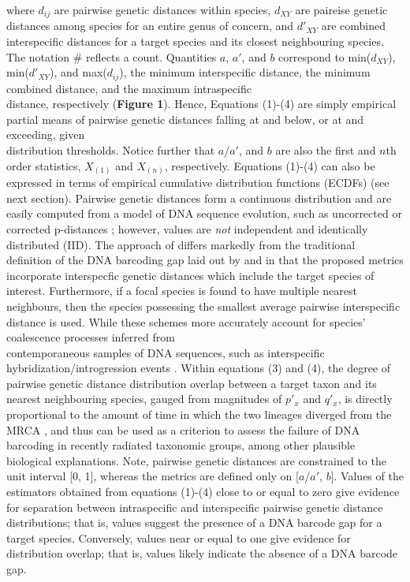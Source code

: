\documentclass[12pt]{article}
\begin{document}
\noindent where $d_{ij}$ are pairwise genetic distances within species, $d_{XY}$ are paireise genetic distances among species for an entire genus of concern, and $d'_{XY}$ are combined interspecific distances for a target species and its closest neighbouring species. The notation \# reflects a count.  Quantities $a$, $a'$, and $b$ correspond to min($d_{XY}$), min($d'_{XY}$), and max($d_{ij}$), the minimum interspecific distance, the minimum combined distance, and the maximum intraspecific \\ distance, respectively (\textbf{Figure 1}). Hence, Equations (1)-(4) are simply empirical partial means of pairwise genetic distances falling at and below, or at and exceeding, given \\ distribution thresholds. Notice further that $a$/$a'$, and $b$ are also the first and $n$th order statistics, $X_{(1)}$ and $X_{(n)}$, respectively. Equations (1)-(4) can also be expressed in terms of empirical cumulative distribution functions (ECDFs) (see next section). Pairwise genetic distances form a continuous distribution and are easily computed from a model of DNA sequence evolution, such as uncorrected or corrected p-distances \citep{jukes1969evolution, kimura1980simple}; however, values are \textit{not} independent and identically distributed (IID). The approach of \citet{phillips2024measure} differs markedly from the traditional definition of the DNA barcoding gap laid out by \citet{meyer2005dna} and \citet{meier2008use} in that the proposed metrics incorporate interspecfic genetic distances which include the target species of interest. Furthermore, if a focal species is found to have multiple nearest neighbours, then the species possessing the smallest average pairwise interspecific distance is used. While these schemes more accurately account for species' coalescence processes inferred from \\ contemporaneous samples of DNA sequences, such as interspecific \\ hybridization/introgression events \citep{phillips2024measure}. Within equations (3) and (4), the degree of pairwise genetic distance distribution overlap between a target taxon and its nearest neighbouring species, gauged from magnitudes of $p'_x$ and $q'_x$, is directly proportional to the amount of time in which the two lineages diverged from the MRCA \citep{phillips2024measure}, and thus can be used as a criterion to assess the failure of DNA barcoding in recently radiated taxonomic groups, among other plausible biological explanations.  Note, pairwise genetic distances are constrained to the unit interval [0, 1], whereas the metrics are defined only on [$a$/$a'$, $b$]. Values of the estimators obtained from equations (1)-(4) close to or equal to zero give evidence for separation between intraspecific and interspecific pairwise genetic distance distributions; that is, values suggest the presence of a DNA barcode gap for a target species. Conversely, values near or equal to one give evidence for distribution overlap; that is, values likely indicate the absence of a DNA barcode gap. 
\end{document}
